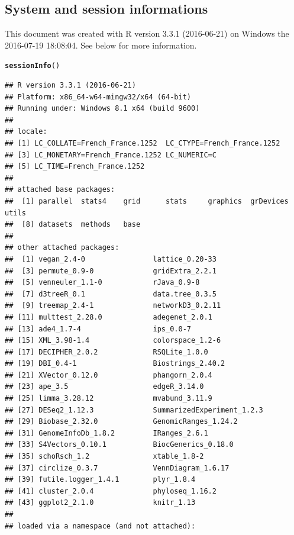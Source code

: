 \documentclass[12pt]{article}\usepackage[]{graphicx}\usepackage[]{color}
\makeatletter
\newcommand{\hlstd}[1]{\textcolor[rgb]{0.345,0.345,0.345}{#1}}%
\newcommand{\hlkwd}[1]{\textcolor[rgb]{0.737,0.353,0.396}{\textbf{#1}}}%
\newenvironment{kframe}{%
 \def\at@end@of@kframe{}%
 \ifinner\ifhmode%
  \def\at@end@of@kframe{\end{minipage}}%
  \begin{minipage}{\columnwidth}%
 \fi\fi%
 \def\FrameCommand##1{\hskip\@totalleftmargin \hskip-\fboxsep
 \colorbox{shadecolor}{##1}\hskip-\fboxsep
     \hskip-\linewidth \hskip-\@totalleftmargin \hskip\columnwidth}%
 \MakeFramed {\advance\hsize-\width
   \@totalleftmargin\z@ \linewidth\hsize
   \@setminipage}}%
 {\par\unskip\endMakeFramed%
 \at@end@of@kframe}
\newenvironment{knitrout}{}{} %
\numberwithin{figure}{section}
\makeatother
\begin{document}
  \subsection{System and session informations}
  This document was created with R version 3.3.1 (2016-06-21) on Windows the 2016-07-19 18:08:04. See below for more information. 
\begin{knitrout}\small
{}\color{fgcolor}\begin{kframe}
\begin{alltt}
\hlkwd{sessionInfo}\hlstd{()}
\end{alltt}
\begin{verbatim}
## R version 3.3.1 (2016-06-21)
## Platform: x86_64-w64-mingw32/x64 (64-bit)
## Running under: Windows 8.1 x64 (build 9600)
## 
## locale:
## [1] LC_COLLATE=French_France.1252  LC_CTYPE=French_France.1252   
## [3] LC_MONETARY=French_France.1252 LC_NUMERIC=C                  
## [5] LC_TIME=French_France.1252    
## 
## attached base packages:
##  [1] parallel  stats4    grid      stats     graphics  grDevices utils    
##  [8] datasets  methods   base     
## 
## other attached packages:
##  [1] vegan_2.4-0                lattice_0.20-33           
##  [3] permute_0.9-0              gridExtra_2.2.1           
##  [5] venneuler_1.1-0            rJava_0.9-8               
##  [7] d3treeR_0.1                data.tree_0.3.5           
##  [9] treemap_2.4-1              networkD3_0.2.11          
## [11] multtest_2.28.0            adegenet_2.0.1            
## [13] ade4_1.7-4                 ips_0.0-7                 
## [15] XML_3.98-1.4               colorspace_1.2-6          
## [17] DECIPHER_2.0.2             RSQLite_1.0.0             
## [19] DBI_0.4-1                  Biostrings_2.40.2         
## [21] XVector_0.12.0             phangorn_2.0.4            
## [23] ape_3.5                    edgeR_3.14.0              
## [25] limma_3.28.12              mvabund_3.11.9            
## [27] DESeq2_1.12.3              SummarizedExperiment_1.2.3
## [29] Biobase_2.32.0             GenomicRanges_1.24.2      
## [31] GenomeInfoDb_1.8.2         IRanges_2.6.1             
## [33] S4Vectors_0.10.1           BiocGenerics_0.18.0       
## [35] schoRsch_1.2               xtable_1.8-2              
## [37] circlize_0.3.7             VennDiagram_1.6.17        
## [39] futile.logger_1.4.1        plyr_1.8.4                
## [41] cluster_2.0.4              phyloseq_1.16.2           
## [43] ggplot2_2.1.0              knitr_1.13                
## 
## loaded via a namespace (and not attached):

\end{verbatim}
\end{kframe}
\end{knitrout}
\end{document}
